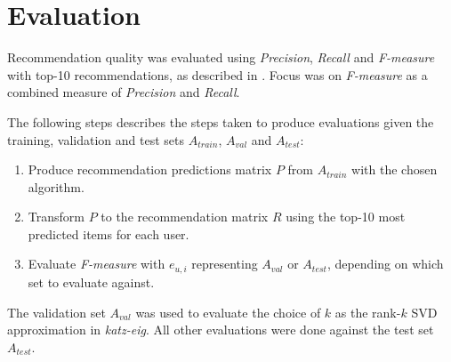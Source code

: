 
\section{Evaluation}\label{sec:method:eval}

Recommendation quality was evaluated using \textit{Precision}, \textit{Recall} and \textit{F-measure} with top-10 recommendations, as described in . Focus was on \textit{F-measure} as a combined measure of \textit{Precision} and \textit{Recall}.

The following steps describes the steps taken to produce evaluations given the training, validation and test sets $A_{train}$, $A_{val}$ and $A_{test}$:

\begin{enumerate}
    \item Produce recommendation predictions matrix $P$ from $A_{train}$ with the chosen algorithm.
    \item Transform $P$ to the recommendation matrix $R$ using the top-10 most predicted items for each user.
    \item Evaluate \textit{F-measure} with $e_{u, i}$ representing $A_{val}$ or $A_{test}$, depending on which set to evaluate against.
\end{enumerate}

The validation set $A_{val}$ was used to evaluate the choice of $k$ as the rank-$k$ SVD approximation in \textit{katz-eig}. All other evaluations were done against the test set $A_{test}$.

